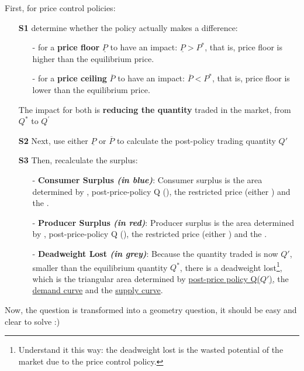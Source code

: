 \documentclass[twoside]{article}
\let\bar\overline
\theoremstyle{definition}
\begin{document}
First, for price control policies:
\begin{itemize}
    \item[\textbf{S1}] determine whether the policy actually makes a difference:
    \begin{itemize}
        \item[-] for a \textbf{price floor} $\underline{P}$ to have an impact: $\underline{P}>P^*$, that is, price floor is higher than the equilibrium price.
        \item[-] for a \textbf{price ceiling} $\bar{P}$ to have an impact: $\bar{P}<P^*$, that is, price floor is lower than the equilibrium price.
    \end{itemize}
    The impact for both is \textbf{reducing the quantity} traded in the market, from $Q^*$ to $Q^{\prime}$
    \item[\textbf{S2}] Next, use either $\underline{P}$ or $\bar{P}$ to calculate the post-policy trading quantity $Q'$
    \item[\textbf{S3}] Then, recalculate the surplus:
    \begin{itemize}
        \item[-] \textbf{\color{myblue}Consumer Surplus \textit{(in blue)}}: Consumer surplus is the area determined by , post-price-policy Q (), the restricted price (either \myhl[myblue]{$\underline{P}$ or $\bar{P}$}) and the . 
        \item[-] \textbf{\color{myred}Producer Surplus \textit{(in red)}}: Producer surplus is the area determined by , post-price-policy Q (), the restricted price (either \myhl[myred]{$\underline{P}$ or $\bar{P}$}) and the . 
        \item[-] \textbf{Deadweight Lost \textit{(in grey)}}: Because the quantity traded is now $Q'$, smaller than the equilibrium quantity $Q^*$, there is a deadweight lost\footnote{Understand it this way: the deadweight lost is the wasted potential of the market due to the price control policy.}, which is the triangular area determined by \underline{post-price policy Q($Q'$)}, the \underline{demand curve} and the \underline{supply curve}.
    \end{itemize}
\end{itemize}

Now, the question is transformed into a geometry question, it should be easy and clear to solve :)
\end{document}
